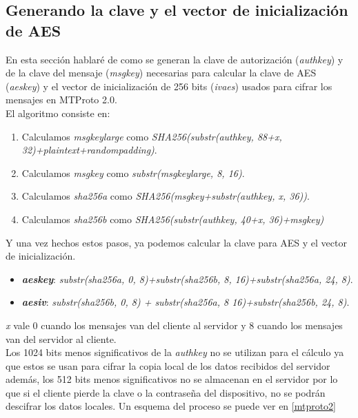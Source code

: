 \subsection{Generando la clave y el vector de inicialización de AES}
En esta sección hablaré de como se generan la clave de autorización (\emph{auth\textunderscore key}) y de la clave del mensaje (\emph{msg\textunderscore key}) necesarias para calcular la clave de AES (\emph{aes\textunderscore key}) y el vector de inicialización de 256 bits (\emph{iv\textunderscore aes}) usados para cifrar los mensajes en MTProto 2.0.\\
El algoritmo consiste en:
\begin{enumerate}
	\item Calculamos \emph{msg\textunderscore key\textunderscore large} como \emph{SHA256(substr(auth\textunderscore key, 88+x, 32)+plaintext+random\textunderscore padding)}.
	\item Calculamos \emph{msg\textunderscore key} como \emph{substr(msg\textunderscore key\textunderscore large, 8, 16)}.
	\item Calculamos \emph{sha256\textunderscore a} como \emph{SHA256(msg\textunderscore key+substr(auth\textunderscore key, x, 36))}.
	\item Calculamos \emph{sha256\textunderscore b} como \emph{SHA256(substr(auth\textunderscore key, 40+x, 36)+msg\textunderscore key)}
\end{enumerate}
Y una vez hechos estos pasos, ya podemos calcular la clave para AES y el vector de inicialización.
\begin{itemize}
	\item \textbf{\emph{aes\textunderscore key}}: \emph{substr(sha256\textunderscore a, 0, 8)+substr(sha256\textunderscore b, 8, 16)+substr(sha256\textunderscore a, 24, 8)}.
	\item \textbf{\emph{aes\textunderscore iv}}: \emph{substr(sha256\textunderscore b, 0, 8) + substr(sha256\textunderscore a, 8 16)+substr(sha256\textunderscore b, 24, 8)}.
\end{itemize}
\emph{x} vale 0 cuando los mensajes van del cliente al servidor y 8 cuando los mensajes van del servidor al cliente.\\
Los 1024 bits menos significativos de la \emph{auth\textunderscore key} no se utilizan para el cálculo ya que estos se usan para cifrar la copia local de los datos recibidos del servidor además, los 512 bits menos significativos no se almacenan en el servidor por lo que si el cliente pierde la clave o la contraseña del dispositivo, no se podrán descifrar los datos locales. Un esquema del proceso se puede ver en \ref{mtproto2}

